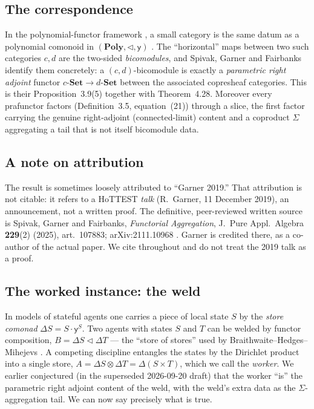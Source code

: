 \documentclass[11pt]{amsart}
\theoremstyle{plain}
\theoremstyle{definition}
\newcommand{\Poly}{\mathbf{Poly}}
\newcommand{\Set}{\mathbf{Set}}
\renewcommand{\lhd}{\triangleleft}
\newcommand{\Store}[1]{\Delta #1}
\newcommand{\yon}{\mathsf{y}}
\begin{document}
\subsection*{The correspondence}
In the polynomial-functor framework \cite{NiuSpivak}, a small category is the same datum as
a polynomial comonoid in $(\Poly,\lhd,\yon)$ \cite{AhmanUustalu}. The ``horizontal'' maps
between two such categories $c,d$ are the two-sided \emph{bicomodules}, and Spivak, Garner
and Fairbanks \cite{SGF} identify them concretely: a $(c,d)$-bicomodule is exactly a
\emph{parametric right adjoint} functor $c\text{-}\Set\to d\text{-}\Set$ between the
associated copresheaf categories. This is their Proposition~3.9(5) together with
Theorem~4.28. Moreover every prafunctor factors (Definition~3.5, equation~(21)) through a
slice, the first factor carrying the genuine right-adjoint (connected-limit) content and a
coproduct $\Sigma$ aggregating a tail that is not itself bicomodule data.

\subsection*{A note on attribution}
The result is sometimes loosely attributed to ``Garner 2019.'' That attribution is not
citable: it refers to a HoTTEST \emph{talk} (R.~Garner, 11 December 2019), an announcement,
not a written proof. The definitive, peer-reviewed written source is Spivak, Garner and
Fairbanks, \emph{Functorial Aggregation}, J.\ Pure Appl.\ Algebra \textbf{229}(2) (2025),
art.~107883; arXiv:2111.10968 \cite{SGF}. Garner is credited there, as a co-author of the
actual paper. We cite \cite{SGF} throughout and do not treat the 2019 talk as a proof.

\subsection*{The worked instance: the weld}
In models of stateful agents one carries a piece of local state $S$ by the \emph{store
comonad} $\Store{S}=S\cdot\yon^S$. Two agents with states $S$ and $T$ can be welded by
functor composition, $B=\Store{S}\lhd\Store{T}$ --- the ``store of stores'' used by
Braithwaite--Hedges--Mihejevs \cite{workersProof}. A competing discipline entangles the
states by the Dirichlet product into a single store,
$A=\Store{S}\otimes\Store{T}=\Store{(S\times T)}$, which we call the \emph{worker}. We
earlier conjectured (in the superseded 2026-09-20 draft) that the worker ``is'' the
parametric right adjoint content of the weld, with the weld's extra data as the
$\Sigma$-aggregation tail. We can now say precisely what is true.
\end{document}
